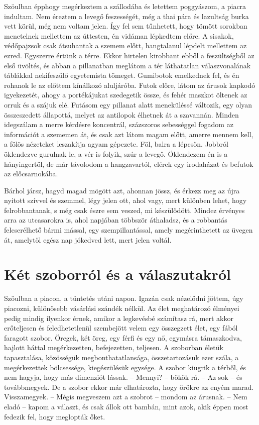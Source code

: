 Szöulban épphogy megérkeztem a szállodába és letettem poggyászom,
a piacra indultam. Nem éreztem a levegő feszességét, még a thai
pára és lazultság burka vett körül, még nem voltam jelen. Így fel sem
tűnhetett, hogy tömött sorokban menetelnek mellettem az úttesten,
én vidáman lépkedtem előre. A sisakok, védőpajzsok csak átsuhantak
a szemem előtt, hangtalanul lépdelt mellettem az ezred. Egyszerre értünk
a térre. Ekkor hirtelen kirobbant ebből a feszültségből az első
üvöltés, és abban a pillanatban meglátom a tér láthatatlan válaszvonalának
táblákkal nekifeszülő egyetemista tömeget. Gumibotok emelkednek fel,
és én rohanok le az előttem kínálkozó aluljáróba. Futok
előre, látom az árusok kapkodó igyekezetét, ahogy a portékájukat szedegetik
össze, és fehér maszkot öltenek az orruk és a szájuk elé. Futásom
egy pillanat alatt meneküléssé változik, egy olyan összeszedett
állapottá, melyet az antilopok élhetnek át a szavannán. Minden idegszálam
a merre kérdésre koncentrál, százszoros sebességgel fogadom
az információt a szememen át, és csak azt látom magam előtt, amerre
mennem kell, a fölös nézeteket leszakítja agyam gépezete. Föl, balra a
lépcsőn. Jobbról öklendezve gurulnak le, a vér is folyik, szúr a levegő.
Öklendezem én is a hányingertől, de már távolodom a hangzavartól,
elérek egy irodaházat és befutok az előcsarnokába.

\bigskip
\begin{itshape}
Bárhol jársz, hagyd magad mögött azt, ahonnan jössz, és érkezz meg
az újra nyitott szívvel és szemmel, légy jelen ott, ahol vagy, mert különben
lehet, hogy felrobbantanak, s még csak észre sem veszed, mi készülődött.
Mindez érvényes arra az utcasarokra is, ahol napjában többször
áthaladsz, és a robbantás felcserélhető bármi mással, egy szempillantással,
amely megérinthetett az üvegen át, amelytől egész nap jókedved lett, mert
jelen voltál.
\end{itshape}

\section{Két szoborról és a válaszutakról}

Szöulban a piacon, a tüntetés utáni napon. Igazán csak nézelődni
jöttem, úgy piacozni, különösebb vásárlási szándék nélkül. Az élet
meghatározó élményei pedig mindig ilyenkor érnek, amikor a legkevésbé
számítasz rá, mert akkor erőteljesen és feledhetetlenül szembejött
velem egy összegzett élet, egy fából faragott szobor. Öregek, két
öreg, egy férfi és egy nő, egymásra támaszkodva, hajlott háttal
megérkezetten, befejezetten, teljesen. A szoborban életük tapasztalása,
közösségük megbonthatatlansága, összetartozásuk ezer szála, a
megérkezettek bölcsessége, kiegészülésük egysége. A szobor kiugrik a
térből, és nem hagyja, hogy más dimenziót lássak. -- Mennyi? -- bökök
rá. -- Az sok -- és továbbmegyek. De a szobor ekkor már elhatározta,
hogy örökre az enyém marad. Visszamegyek. -- Mégis megveszem azt
a szobrot -- mondom az árusnak. -- Nem eladó -- kapom a választ, és
csak állok ott bambán, mint azok, akik éppen most fedezik fel, hogy
meglopták őket.

